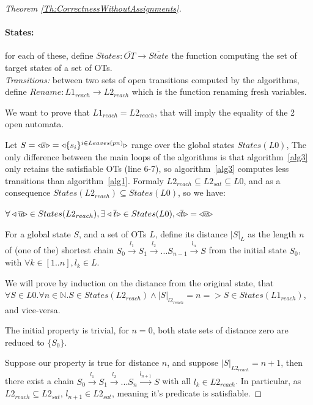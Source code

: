 \documentclass[smallcondensed]{svjour3}
\begin{document}
\begin{proof}[Theorem \ref{Th:CorrectnessWithoutAssignments}]
\paragraph{States:} for each of these, define
 $States: \overline{OT}\rightarrow\overline{State}$ the function
computing the set of target states of a set of OTs. \\
\noindent
\emph{Transitions:} between two sets of open transitions computed
by the algorithms, define $Rename:  L1_{reach} \rightarrow L2_{reach}$
which is the function renaming fresh variables. 

We want to prove that $L1_{reach}=L2_{reach}$, that will imply
the equality of the 2 open automata.

\smallskip
Let $S=\triangleleft{\overline{s}}\triangleright=\triangleleft{\{s_{i}\}^{i\in Leaves(pn)}}\triangleright$
range over the global states $States(L0)$, 
The only difference between the main loops of the algorithms is that 
algorithm~\ref{alg3} only retains the satisfiable OTs (line 6-7), so 
algorithm~\ref{alg3} computes less transitions than
algorithm~\ref{alg1}. Formaly $L2_{reach}\subseteq  L2_{sat} \subseteq L0$, and as a consequence $States(L2_{reach})\subseteq  States(L0)$, so we have:\\
\centerline{$\forall \triangleleft{\overline{u}}\triangleright\in States(L2_{reach}), \exists\triangleleft{\overline{t}}\triangleright\in States(L0), \triangleleft{\overline{t}}\triangleright=\triangleleft{\overline{u}}\triangleright$}

For a global state $S$, and a set of OTs $L$, define its distance
$|S|_L$ as the length $n$ of (one of the) shortest chain
$S_0\xrightarrow{l_1}S_1\xrightarrow{l_2}...S_{n-1}\xrightarrow{l_{n}}S$
  from the initial state $S_0$, with $\forall k\in [1..n], l_k \in L$.

\medskip
We will prove by induction on the distance from the original state,
that $\forall S \in L0. \forall n \in \mathbb{N}. S \in States(L2_{reach}) \land |S|_{l2_{reach}}=n => S
\in States(L1_{reach})$, and vice-versa.

  The initial property is trivial, for $n=0$, both state sets of
  distance zero are reduced to $\{S_0\}$.

  Suppose our property is true for distance $n$, and
  suppose $|S|_{L2_{reach}}=n+1$, then there exist a chain
  $S_0\xrightarrow{l_1}S_1\xrightarrow{l_2}...S_{n}\xrightarrow{l_{n+1}}S$
  with all $l_k \in L2_{reach}$. In particular, as
  $L2_{reach}\subseteq L2_{sat}$, $l_{n+1} \in L2_{sat}$, meaning 
  it's predicate is satisfiable.
  

\end{proof}
\end{document}
